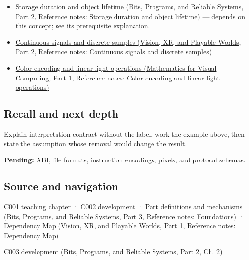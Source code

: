 \begin{itemize}
\item
  \href{../01-Bits-Programs-and-Reliable-Systems-P02/main.pdf\#nameddest=appendix-0b104bcba06b}{Storage duration and object lifetime (Bits, Programs, and Reliable Systems, Part 2, Reference notes: Storage duration and object lifetime)} --- depends on this concept; see its prerequisite explanation.
\item
  \href{../07-Vision-XR-and-Playable-Worlds-P02/main.pdf\#nameddest=appendix-1077ea8fc737}{Continuous signals and discrete samples (Vision, XR, and Playable Worlds, Part 2, Reference notes: Continuous signals and discrete samples)}
\item
  \href{../02-Mathematics-for-Visual-Computing-P01/main.pdf\#nameddest=appendix-a9f83ad40792}{Color encoding and linear-light operations (Mathematics for Visual Computing, Part 1, Reference notes: Color encoding and linear-light operations)}
\end{itemize}

\subsection{Recall and next depth}\label{appendix-f414bd4ed05c-recall-and-next-depth}

\hypertarget{appendix-f414bd4ed05c-recall-and-next-depth}{}

Explain interpretation contract without the label, work the example above, then state the assumption whose removal would change the result.

\textbf{Pending:} ABI, file formats, instruction encodings, pixels, and protocol schemas.

\subsection{Source and navigation}\label{appendix-f414bd4ed05c-source-and-navigation}

\hypertarget{appendix-f414bd4ed05c-source-and-navigation}{}

\hyperref[01-foundations-i-ch001-from-a-signal-to-an-interpretation]{C001 teaching chapter} · \hyperref[01-foundations-i-ch001-arithmetic-becomes-a-policy]{C002 development} · \href{../01-Bits-Programs-and-Reliable-Systems-P03/main.pdf\#nameddest=appendix-fd090d982a15}{Part definitions and mechanisms (Bits, Programs, and Reliable Systems, Part 3, Reference notes: Foundations)} · \href{../07-Vision-XR-and-Playable-Worlds-P01/main.pdf\#nameddest=appendix-4ad47bdd269a}{Dependency Map (Vision, XR, and Playable Worlds, Part 1, Reference notes: Dependency Map)}

\href{../01-Bits-Programs-and-Reliable-Systems-P02/main.pdf\#nameddest=01-foundations-i-ch002-where-the-bytes-live}{C003 development (Bits, Programs, and Reliable Systems, Part 2, Ch. 2)}
